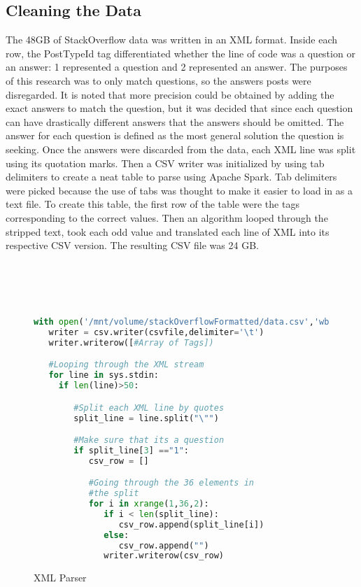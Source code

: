 \documentclass[9pt,twocolumn,twoside]{idsi}
\begin{document}
\subsection{Cleaning the Data}
The 48GB of StackOverflow data was written in an XML format. Inside each row, the PostTypeId tag differentiated whether the line of code was a question or an answer: 1 represented a question and 2 represented an answer. The purposes of this research was to only match questions, so the answers posts were disregarded. It is noted that more precision could be obtained by adding the exact answers to match the question, but it was decided that since each question can have drastically different answers that the answers should be omitted. 
The answer for each question is defined as the most general solution the question is seeking. Once the answers were discarded from the data, each XML line was split using its quotation marks. 
Then a CSV writer was initialized by using tab delimiters to create a neat table to parse using Apache Spark. Tab delimiters were picked because the use of tabs was thought to make it easier to load in as a text file. To create this table, the first row of the table were the tags corresponding to the correct values. Then an algorithm looped through the stripped text, took each odd value and translated each line of XML into its respective CSV version. The resulting CSV file was 24 GB. \\\\\\\\
\\

\begin{figure}[h!]

\begin{lstlisting}[language=python]
with open('/mnt/volume/stackOverflowFormatted/data.csv','wb') as csvfile:
   writer = csv.writer(csvfile,delimiter='\t')
   writer.writerow([#Array of Tags])

   #Looping through the XML stream
   for line in sys.stdin:
     if len(line)>50:

        #Split each XML line by quotes
        split_line = line.split("\"")

        #Make sure that its a question
        if split_line[3] =="1":
           csv_row = []

           #Going through the 36 elements in
           #the split
           for i in xrange(1,36,2):
              if i < len(split_line):
                 csv_row.append(split_line[i])
              else:
                 csv_row.append("")
              writer.writerow(csv_row)
\end{lstlisting}
\caption{XML Parser}
\end{figure}
\end{document}
